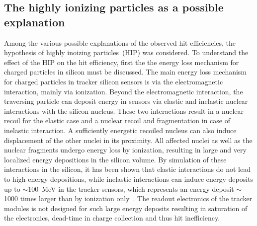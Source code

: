 




\subsection{The highly ionizing particles as a possible explanation}

Among the various possible explanations of the observed hit efficiencies, the hypothesis of highly inoizing particles~(HIP) was considered. To understand the effect of the HIP on the hit efficiency, first the the energy loss mechanism for charged particles in silicon must be discussed. The main energy loss mechanism for charged particles in tracker silicon sensors is via the electromagnetic interaction, mainly via ionization. Beyond the electromagnetic interaction, the traversing particle can deposit energy in sensors via elastic and inelastic nuclear interactions with the silicon nucleus. These two interactions result in a nuclear recoil for the elastic case and a nuclear recoil and fragmentation in case of inelastic interaction. A sufficiently energetic recoiled nucleus can also induce displacement of the other nuclei in its proximity. All affected nuclei as well as the nuclear fragments undergo energy loss by ionization, resulting in large and very localized energy depositions in the silicon volume. By simulation of these interactions in the silicon, it has been shown that elastic interactions do not lead to high energy depositions, while inelastic interactions can induce energy deposits up to $\sim$100~MeV in the tracker sensors, which represents an energy deposit $\sim$1000 times larger than by ionization only~\cite{Huhtinen:2002yda}. The readout electronics of the tracker modules is not designed for such large energy deposits resulting in saturation of the electronics, dead-time in charge collection and thus hit inefficiency.

